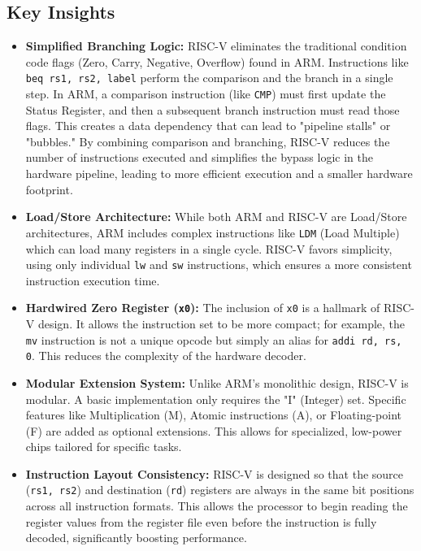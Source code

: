 \documentclass[12pt,a4paper]{article}
\begin{document}
\subsection*{Key Insights}
\begin{itemize}
    \item \textbf{Simplified Branching Logic:} RISC-V eliminates the traditional condition code flags (Zero, Carry, Negative, Overflow) found in ARM. Instructions like \texttt{beq rs1, rs2, label} perform the comparison and the branch in a single step. In ARM, a comparison instruction (like \texttt{CMP}) must first update the Status Register, and then a subsequent branch instruction must read those flags. This creates a data dependency that can lead to "pipeline stalls" or "bubbles." By combining comparison and branching, RISC-V reduces the number of instructions executed and simplifies the bypass logic in the hardware pipeline, leading to more efficient execution and a smaller hardware footprint.
    \item \textbf{Load/Store Architecture:} While both ARM and RISC-V are Load/Store architectures, ARM includes complex instructions like \texttt{LDM} (Load Multiple) which can load many registers in a single cycle. RISC-V favors simplicity, using only individual \texttt{lw} and \texttt{sw} instructions, which ensures a more consistent instruction execution time.
    \item \textbf{Hardwired Zero Register (\texttt{x0}):} The inclusion of \texttt{x0} is a hallmark of RISC-V design. It allows the instruction set to be more compact; for example, the \texttt{mv} instruction is not a unique opcode but simply an alias for \texttt{addi rd, rs, 0}. This reduces the complexity of the hardware decoder.
    \item \textbf{Modular Extension System:} Unlike ARM's monolithic design, RISC-V is modular. A basic implementation only requires the "I" (Integer) set. Specific features like Multiplication (M), Atomic instructions (A), or Floating-point (F) are added as optional extensions. This allows for specialized, low-power chips tailored for specific tasks.
    \item \textbf{Instruction Layout Consistency:} RISC-V is designed so that the source (\texttt{rs1, rs2}) and destination (\texttt{rd}) registers are always in the same bit positions across all instruction formats. This allows the processor to begin reading the register values from the register file even before the instruction is fully decoded, significantly boosting performance.
\end{itemize}
\end{document}
